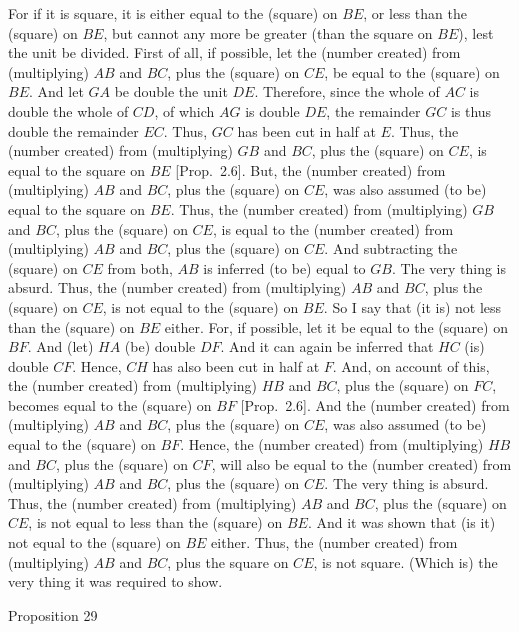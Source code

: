 For if it is square, it is either equal to the (square) on $BE$, or
less than the (square) on $BE$, but cannot    any more be greater  (than the square on $BE$), lest the unit be divided. First of all, if possible, let the
(number created) from (multiplying) $AB$ and $BC$, plus the (square) on
$CE$, be equal to the (square) on $BE$. And let $GA$ be double the unit
$DE$. Therefore, since the whole of $AC$ is double the whole
of $CD$, of which $AG$ is double $DE$, the remainder $GC$
is thus double the remainder $EC$. Thus, $GC$ has been cut in half at $E$.
Thus, the (number created) from (multiplying) $GB$ and $BC$,
plus the (square) on $CE$, is equal to the square on $BE$ [Prop.~2.6]. But, the (number created) from (multiplying) $AB$ and $BC$, plus the (square) on $CE$, was also assumed
 (to be) equal to the square on $BE$. Thus, the (number created) from
 (multiplying) $GB$ and $BC$, plus the (square) on $CE$, is equal to
 the (number created) from (multiplying)  $AB$ and $BC$, plus the
 (square) on $CE$. And subtracting the (square) on $CE$ from both, $AB$ is  inferred (to be) equal to $GB$. The very thing is absurd. Thus, the (number created) from (multiplying) $AB$ and $BC$, plus the (square) on
$CE$, is not equal to the (square) on $BE$. So I say that (it is) not
less than the (square) on $BE$ either. For, if possible, let it be equal to
the (square) on $BF$. And (let) $HA$ (be) double $DF$. And it
can again be inferred that $HC$ (is) double $CF$. Hence, $CH$ has
also been cut in half at $F$. And, on account of this, the (number created)
from (multiplying) $HB$ and $BC$, plus the (square) on $FC$, becomes
equal to the (square) on $BF$ [Prop.~2.6]. 
And the (number created) from (multiplying) $AB$ and $BC$, plus the
(square) on $CE$, was also
assumed (to be) equal to the (square) on $BF$.
Hence,
the (number created) from (multiplying) $HB$ and $BC$, plus the
(square) on $CF$, will also be equal to the
(number created) from (multiplying) $AB$ and $BC$, plus the (square) on $CE$. The very thing is
absurd. Thus, the (number created) from (multiplying) $AB$ and $BC$,
plus the (square) on $CE$, is not equal to less than the
(square) on $BE$. And it was shown that  (is it) not equal to the (square)
on $BE$ either. Thus, the (number created) from (multiplying)
$AB$ and $BC$, plus the  square on $CE$, is not square. (Which is)
the very thing it was required to show.


\begin{center}
{\large Proposition 29}
\end{center}

